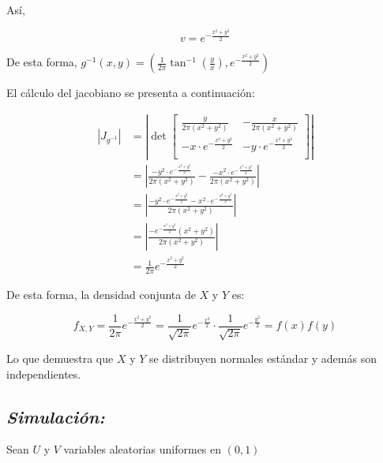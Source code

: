 \documentclass[]{article}
\begin{document}
Así,

\begin{equation}
v = e^{-\frac{x^2+y^2}{2}}
\end{equation}

De esta forma,
\(g^{-1}(x,y)= \left(\frac{1}{2 \pi}\tan^{-1}\left( \frac{y}{x} \right),e^{-\frac{x^2+y^2}{2}}\right)\)

El cálculo del jacobiano se presenta a continuación:

\begin{equation}
\begin{split}
\left| J_{g^{-1}}  \right|
&=\left| \det 
\begin{bmatrix} 
\frac{y}{2\pi(x^2+y^2)} &  -\frac{x}{2\pi(x^2+y^2)} \\
-x\cdot e^{-\frac{x^2+y^2}{2}} &  -y\cdot e^{-\frac{x^2+y^2}{2}} \\
\end{bmatrix}  \right|\\
&=
\left|
\frac{-y^2\cdot e^{-\frac{x^2+y^2}{2}}}{2\pi(x^2+y^2)}-
\frac{-x^2\cdot e^{-\frac{x^2+y^2}{2}}}{2\pi(x^2+y^2)}
\right|\\
&=
\left|
\frac{-y^2\cdot e^{-\frac{x^2+y^2}{2}}-x^2\cdot e^{-\frac{x^2+y^2}{2}}}{2\pi(x^2+y^2)}
\right|\\
&=
\left|
\frac{-e^{-\frac{x^2+y^2}{2}}(x^2+y^2)}{2\pi(x^2+y^2)}
\right|\\
&=
\frac{1}{2\pi}e^{-\frac{x^2+y^2}{2}}
\end{split}
\end{equation}

De esta forma, la densidad conjunta de \(X\) y \(Y\) es:

\begin{equation}
f_{X,Y}=\frac{1}{2\pi}e^{-\frac{x^2+y^2}{2}}=\frac{1}{\sqrt{2\pi}}e^{-\frac{x^2}{2}} \cdot \frac{1}{\sqrt{2\pi}}e^{-\frac{y^2}{2}}=f(x)f(y)
\end{equation}

Lo que demuestra que \(X\) y \(Y\) se distribuyen normales estándar y
además son independientes.

\subsection{\texorpdfstring{\emph{Simulación:}}{Simulación:}}\label{simulacion-3}

Sean \(U\) y \(V\) variables aleatorias uniformes en \((0,1)\)
\end{document}

